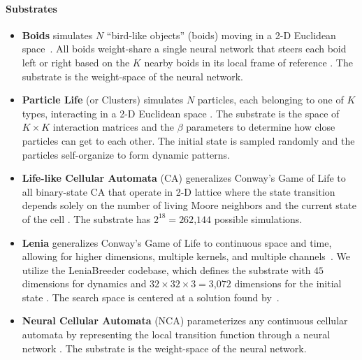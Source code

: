 \documentclass{article}
\begin{document}
\paragraph{Substrates}
\begin{itemize}
    \item
\textbf{Boids} simulates $N$ ``bird-like objects'' (boids) moving in a 2-D Euclidean space~\citep{reynolds1987flocks}.
All boids weight-share a single neural network that steers each boid left or right based on the $K$ nearby boids in its local frame of reference .
The substrate is the weight-space of the neural network.
    \item
\textbf{Particle Life} (or Clusters) simulates $N$ particles, each belonging to one of $K$ types, interacting in a 2-D Euclidean space \citep{ventrella2017clusters, mohr2023particlelife}.
The substrate is the space of $K\times K$ interaction matrices and the $\beta$ parameters to determine how close particles can get to each other.
The initial state is sampled randomly and the particles self-organize to form dynamic patterns.
    \item
\textbf{Life-like Cellular Automata} (CA) generalizes Conway’s Game of Life to all binary-state CA that operate in 2-D lattice where the state transition depends solely on the number of living Moore neighbors and the current state of the cell \citep{wojtowicz2024cellular}. 
The substrate has $2^{18}=262$,$144$ possible simulations.
    \item
\textbf{Lenia} generalizes Conway’s Game of Life to continuous space and time, allowing for higher dimensions, multiple kernels, and multiple channels~\citep{chan2018lenia}.
We utilize the LeniaBreeder codebase, which defines the substrate with $45$ dimensions for dynamics and $32 \times 32 \times 3 = 3$,$072$ dimensions for the initial state \citep{faldor2024toward}.
The search space is centered at a solution found by~\citet{chan2020lenia}.
    \item
\textbf{Neural Cellular Automata} (NCA) parameterizes any continuous cellular automata by representing the local transition function through a neural network \citep{mordvintsev2020growing}.
The substrate is the weight-space of the neural network.
\end{itemize}
\end{document}
